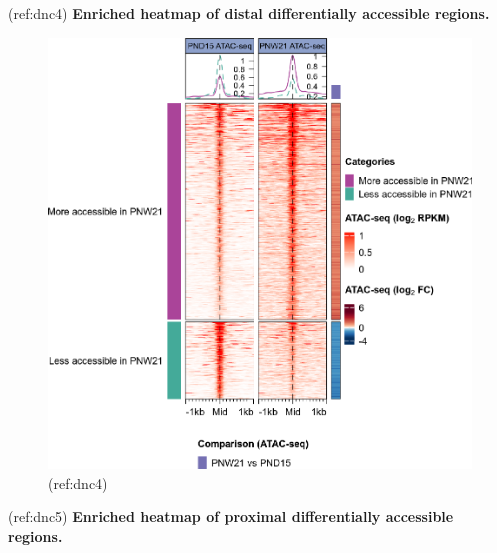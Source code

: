\documentclass[12pt,twoside]{reedthesis}
\begin{document}
(ref:dnc4)
\textbf{Enriched heatmap of distal differentially accessible regions.}
\begin{figure}[h]

{\centering \includegraphics{thesis_files/figure-latex/dn4-1} 

}

\caption[Enriched heatmap of distal DARs]{(ref:dnc4)}\label{fig:dn4}
\end{figure}
(ref:dnc5)
\textbf{Enriched heatmap of proximal differentially accessible regions.}
\end{document}
